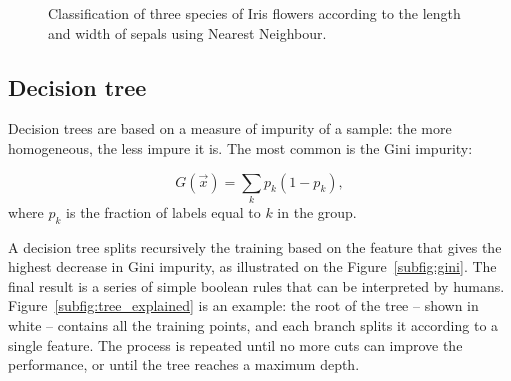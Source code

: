 \begin{figure}[htb]
	\centering
	\hfill
	\caption{Classification of three species of Iris flowers according to the length and width of sepals using Nearest Neighbour.}\label{fig:knn}
\end{figure}

\subsection{Decision tree}\label{sec:decision_tree}
Decision trees are based on a measure of impurity of a sample: the more homogeneous, the less impure it is.
The most common is the Gini impurity:

\[ G(\vec x) = \sum_k p_{k} (1-p_k),\]
where $p_k$ is the fraction of labels equal to $k$ in the group.

A decision tree splits recursively the training based on the feature that gives the highest decrease in Gini impurity, as illustrated on the Figure~\ref{subfig:gini}.
The final result is a series of simple boolean rules that can be interpreted by humans.
Figure~\ref{subfig:tree_explained} is an example: the root of the tree -- shown in white -- contains all the training points, and each branch splits it according to a single feature.
The process is repeated until no more cuts can improve the performance, or until the tree reaches a maximum depth.

